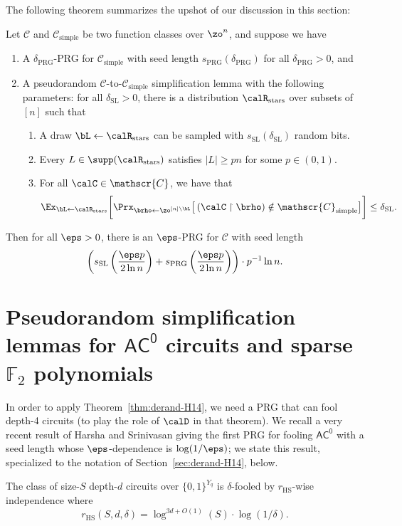 \documentclass{toc}
\theoremstyle{plain}
\newcommand{\acz}{\mathsf{AC^0}}
\newcommand{\uhr}{\upharpoonright}
\newcommand{\simple}{\mathrm{simple}}
\newcommand{\stars}{\mathrm{stars}}
\newcommand{\PRG}{\mathrm{PRG}}
\newcommand{\SL}{\mathrm{SL}}
\renewcommand{\F}{\mathds{F}}
\begin{document}
The following theorem summarizes the upshot of our discussion in this section: 

\begin{theorem}
\label{thm:AW}
Let $\mathscr{C}$ and $\mathscr{C}_\simple$ be two function classes over $\zo^n$, and suppose we have 
\begin{enumerate}
\item A $\delta_\PRG$-PRG for $\mathscr{C}_\simple$ with seed length $s_\PRG(\delta_\PRG)$ for all $\delta_\PRG > 0$, and 
\item A pseudorandom $\mathscr{C}$-to-$\mathscr{C}_\simple$ simplification lemma with the following parameters: for all $\delta_\SL > 0$, there is a distribution $\calR_\stars$ over subsets of $[n]$ such that 
\begin{enumerate}
\item A draw $\bL \leftarrow\calR_\stars$ can be sampled with $s_\SL(\delta_\SL)$ random bits. 
\item Every $L \in \supp(\calR_\stars)$ satisfies $|L| \ge pn$ for some $p \in (0,1)$. 
\item For all $\calC \in \mathscr{C}$, we have that 
 \[ \Ex_{\bL\leftarrow\calR_{\stars}}\bigg[ \Prx_{\brho\leftarrow\zo^{[n]\setminus \bL}}\big[\, (\calC \uhr \brho) \notin \mathscr{C}_\simple\big] \bigg]  \le \delta_\SL.\] 
 \end{enumerate} 
\end{enumerate} 
Then for all $\eps > 0$, there is an $\eps$-PRG for $\mathscr{C}$ with seed length
\[ \left(s_\SL\left(\frac{\eps p}{2\ln n}\right) + s_\PRG\left(\frac{\eps p}{2\ln n}\right)\right) \cdot p^{-1}\ln n.\] 
\end{theorem} 






\section{Pseudorandom simplification lemmas for $\acz$ circuits and sparse $\F_2$ polynomials}  \label{sec:prsl}

In order to apply Theorem~\ref{thm:derand-H14}, we need a PRG that can fool depth-4 circuits (to play the role of $\calD$ in that theorem).
We recall a very recent result of Harsha and Srinivasan giving the first PRG for fooling $\acz$ with a seed length whose $\eps$-dependence is $\log(1/\eps)$; we state this result, specialized to the notation of Section~\ref{sec:derand-H14}, below.
\begin{theorem}
\label{thm:HS16journal}
The class of size-$S$ depth-$d$ circuits over $\{0,1\}^{Y_q}$ is $\delta$-fooled by $r_{\mathrm{HS}}$-wise independence where 
\[ r_{\mathrm{HS}}(S,d,\delta) = \log^{3d+O(1)}(S) \cdot \log(1/\delta). \]
\end{theorem}
\end{document}
